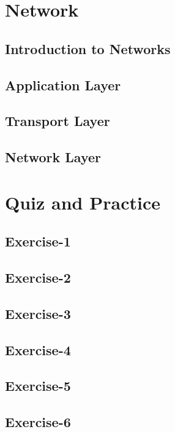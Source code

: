 \documentclass[
  11pt,
  a4paper,
]{book}
\begin{document}
\chapter{Network}
\section{Introduction to Networks}


\section{Application Layer}


\section{Transport Layer}


\section{Network Layer}



\chapter{Quiz and Practice}
\section{Exercise-1}

\section{Exercise-2}

\section{Exercise-3}

\section{Exercise-4}

\section{Exercise-5}

\section{Exercise-6}

\end{document}
